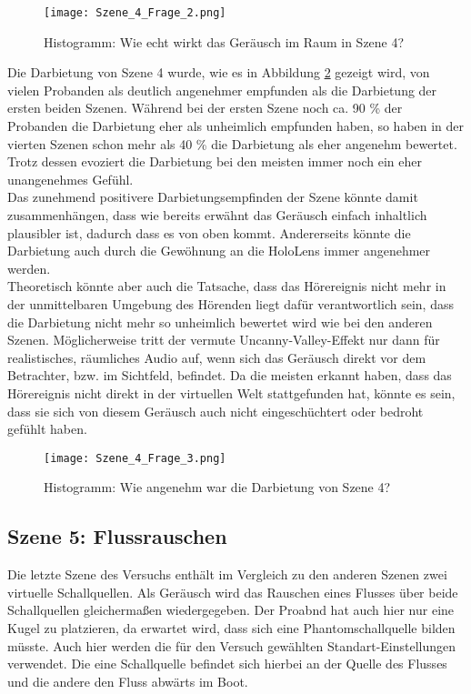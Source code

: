    \begin{figure}[H]
\centering
\texttt{[image: Szene\_4\_Frage\_2.png]}
\caption{Histogramm: Wie echt wirkt das Geräusch im Raum in Szene 4?}
\label{fig:Szene_4_Frage2}
\end{figure} 

Die Darbietung von Szene 4 wurde, wie es in Abbildung \ref{fig:Szene_4_Frage3} gezeigt wird,  von vielen Probanden als deutlich angenehmer empfunden als die Darbietung der ersten beiden Szenen. Während bei der ersten Szene noch ca. 90 \% der Probanden die Darbietung eher als unheimlich empfunden haben, so haben in der vierten Szenen schon mehr als 40 \% die Darbietung als eher angenehm bewertet. Trotz dessen evoziert die Darbietung bei den meisten immer noch ein eher unangenehmes Gefühl.\\ 

Das zunehmend positivere Darbietungsempfinden der Szene könnte damit zusammenhängen, dass wie bereits erwähnt das Geräusch einfach inhaltlich plausibler ist, dadurch dass es von oben kommt. Andererseits könnte die Darbietung auch durch die Gewöhnung an die HoloLens immer angenehmer werden. \\ 

Theoretisch könnte aber auch die Tatsache, dass das Hörereignis nicht mehr in der unmittelbaren Umgebung des Hörenden liegt dafür verantwortlich sein, dass die Darbietung nicht mehr so unheimlich bewertet wird wie bei den anderen Szenen. Möglicherweise tritt der vermute \glqq Uncanny-Valley\grqq{}-Effekt nur dann für realistisches, räumliches Audio auf, wenn sich das Geräusch direkt vor dem Betrachter, bzw. im Sichtfeld, befindet. Da die meisten erkannt haben, dass das Hörereignis nicht direkt in der virtuellen Welt stattgefunden hat, könnte es sein, dass sie sich von diesem Geräusch auch nicht eingeschüchtert oder bedroht gefühlt haben.
 

   \begin{figure}[H]
\centering
\texttt{[image: Szene\_4\_Frage\_3.png]}
\caption{Histogramm: Wie angenehm war die Darbietung von Szene 4?}
\label{fig:Szene_4_Frage3}
\end{figure} 



 \subsection{Szene 5: Flussrauschen}
Die letzte Szene des Versuchs enthält im Vergleich zu den anderen Szenen zwei virtuelle Schallquellen. Als Geräusch wird das Rauschen eines Flusses über beide Schallquellen gleichermaßen wiedergegeben. Der Proabnd hat auch hier nur eine Kugel zu platzieren, da erwartet wird, dass sich eine Phantomschallquelle bilden müsste. Auch hier werden die für den Versuch gewählten Standart-Einstellungen verwendet. Die eine Schallquelle befindet sich hierbei an der Quelle des Flusses und die andere den Fluss abwärts im Boot. \\ 

